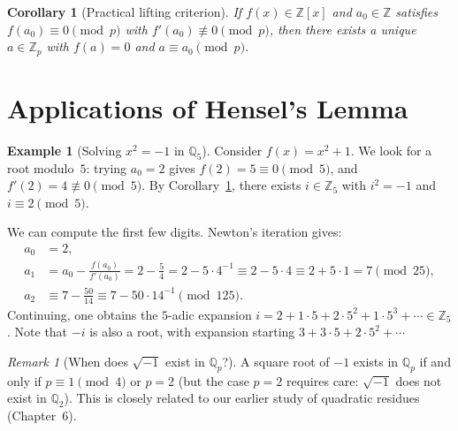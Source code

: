 \documentclass[12pt,a4paper,openany]{book}
\theoremstyle{definition}
\newtheorem{example}[definition]{Example}
\theoremstyle{plain}
\newtheorem{corollary}[definition]{Corollary}
\theoremstyle{remark}
\newtheorem{remark}[definition]{Remark}
\newcommand{\Z}{\mathbb{Z}}
\newcommand{\Q}{\mathbb{Q}}
\begin{document}
\begin{corollary}[Practical lifting criterion]
\label{cor:hensel-practical}
If $f(x) \in \Z[x]$ and $a_0 \in \Z$ satisfies $f(a_0) \equiv 0 \pmod{p}$
with $f'(a_0) \not\equiv 0 \pmod{p}$, then there exists a unique
$a \in \Z_p$ with $f(a) = 0$ and $a \equiv a_0 \pmod{p}$.
\end{corollary}


\section{Applications of Hensel's Lemma}
\label{sec:hensel-apps}

\begin{example}[Solving $x^2 = -1$ in $\Q_5$]
\label{ex:sqrt-minus1-Q5}
Consider $f(x) = x^2 + 1$. We look for a root modulo~$5$: trying $a_0 = 2$
gives $f(2) = 5 \equiv 0 \pmod{5}$, and $f'(2) = 4 \not\equiv 0 \pmod{5}$.
By Corollary~\ref{cor:hensel-practical}, there exists $i \in \Z_5$ with
$i^2 = -1$ and $i \equiv 2 \pmod{5}$.

We can compute the first few digits. Newton's iteration gives:
\begin{align*}
  a_0 &= 2,\\
  a_1 &= a_0 - \frac{f(a_0)}{f'(a_0)} = 2 - \frac{5}{4}
       = 2 - 5\cdot 4^{-1} \equiv 2 - 5 \cdot 4 \equiv 2 + 5\cdot 1
       = 7 \pmod{25},\\
  a_2 &\equiv 7 - \frac{50}{14} \equiv 7 - 50 \cdot 14^{-1} \pmod{125}.
\end{align*}
Continuing, one obtains the $5$-adic expansion
$i = 2 + 1\cdot 5 + 2\cdot 5^2 + 1\cdot 5^3 + \cdots \in \Z_5$.
Note that $-i$ is also a root, with expansion starting $3 + 3\cdot 5 + 2\cdot 5^2 + \cdots$
\end{example}

\begin{remark}[When does $\sqrt{-1}$ exist in $\Q_p$?]
\label{rem:sqrt-minus1-Qp}
A square root of $-1$ exists in $\Q_p$ if and only if $p \equiv 1 \pmod{4}$
or $p = 2$ (but the case $p=2$ requires care: $\sqrt{-1}$ does not exist
in $\Q_2$). This is closely related to our earlier study of quadratic residues
(Chapter~6).
\end{remark}

\end{document}
